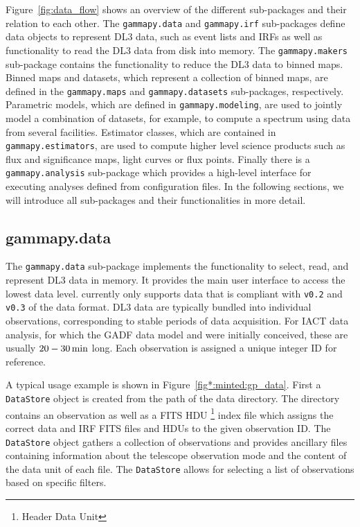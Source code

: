 \documentclass[longauth]{aa}
\newcommand{\code}[1]{\texttt{#1}}
\begin{document}
Figure~\ref{fig:data_flow} shows an overview of the different sub-packages and
their relation to each other. The \code{gammapy.data} and \code{gammapy.irf}
sub-packages define data objects to represent DL3 data, such as
event lists and IRFs as well as functionality
to read the DL3 data from disk into memory. The \code{gammapy.makers} sub-package
contains the functionality to reduce the DL3 data to binned maps.
Binned maps and datasets, which represent a collection of binned
maps, are defined in the \code{gammapy.maps} and \code{gammapy.datasets}
sub-packages, respectively. Parametric models, which are defined in
\code{gammapy.modeling}, are used to jointly model a combination
of datasets, for example, to compute a spectrum using data from several facilities. Estimator classes,
which are contained in \code{gammapy.estimators}, are used to
compute higher level science products such as flux and significance maps,
light curves or flux points. Finally there is a \code{gammapy.analysis}
sub-package which provides a high-level interface for executing analyses
defined from configuration files. In the following sections, we will
introduce all sub-packages and their functionalities in more detail.


\subsection{gammapy.data}
\label{ssec:gammapy-data}
The \code{gammapy.data} sub-package implements the functionality to select,
read, and represent DL3 \gammaray data in memory. It provides the main user
interface to access the lowest data level. \gammapy currently only
supports data that is compliant with \code{v0.2} and \code{v0.3} of the \gadf data format.
DL3 data are typically bundled into individual observations, corresponding to stable periods of data acquisition. For IACT data analysis,
for which the GADF data model and \gammapy were initially conceived,
these are usually $20 - 30\,{\rm min}$ long.
Each observation is assigned a unique integer ID for reference.

A typical usage example is shown in Figure~\ref{fig*:minted:gp_data}.
First a \code{DataStore} object is created from the path of the data
directory. The directory contains an observation as well as a FITS HDU \footnote{Header Data Unit} 
index file which assigns the correct data and IRF FITS files and HDUs
to the given observation ID. The \code{DataStore}
object gathers a collection of observations and provides ancillary
files containing information about the telescope observation mode and the
content of the data unit of each file. The \code{DataStore} allows for
selecting a list of observations based on specific filters.
\end{document}
